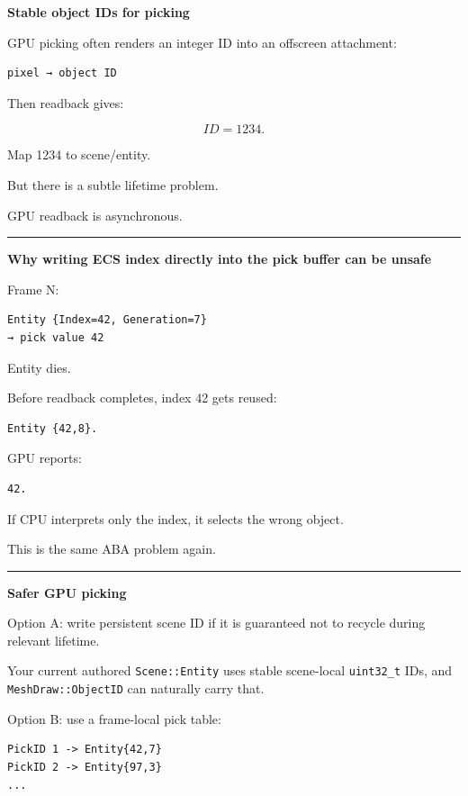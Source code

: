 \textbf{Stable object IDs for picking}

GPU picking often renders an integer ID into an offscreen attachment:

\begin{verbatim}
pixel → object ID
\end{verbatim}

Then readback gives:

\[
ID=1234.
\]

Map 1234 to scene/entity.

But there is a subtle lifetime problem.

GPU readback is asynchronous.

\begin{center}\rule{0.5\linewidth}{0.5pt}\end{center}

\textbf{Why writing ECS index directly into the pick buffer can be unsafe}

Frame N:

\begin{verbatim}
Entity {Index=42, Generation=7}
→ pick value 42
\end{verbatim}

Entity dies.

Before readback completes, index 42 gets reused:

\begin{verbatim}
Entity {42,8}.
\end{verbatim}

GPU reports:

\begin{verbatim}
42.
\end{verbatim}

If CPU interprets only the index, it selects the wrong object.

This is the same ABA problem again.

\begin{center}\rule{0.5\linewidth}{0.5pt}\end{center}

\textbf{Safer GPU picking}

Option A: write persistent scene ID if it is guaranteed not to recycle during relevant lifetime.

Your current authored \texttt{Scene::Entity} uses stable scene-local \texttt{uint32\_t} IDs, and \texttt{MeshDraw::ObjectID} can naturally carry that.

Option B: use a frame-local pick table:

\begin{verbatim}
PickID 1 -> Entity{42,7}
PickID 2 -> Entity{97,3}
...
\end{verbatim}

